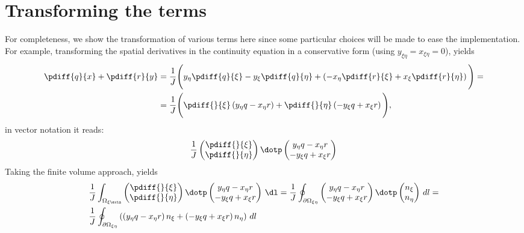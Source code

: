 \section{Transforming the terms}
For completeness, we show the transformation of various terms here since some particular choices will be made to ease the implementation.
For example, transforming the spatial derivatives in the continuity equation in a conservative form (using $y_{\xi\eta} = x_{\xi\eta} = 0$), yields
%
\begin{align}
	\pdiff{q}{x} + \pdiff{r}{y}  & = \frac{1}{J} \Bigg(  y_{\eta} \pdiff{q}{\xi}
    -y_{\xi}\pdiff{q}{\eta} +\left( - x_{\eta}\pdiff{r}{\xi}
    +x_{\xi}\pdiff{r}{\eta} \right) \Bigg) =
     \\
    & =\frac{1}{J}\Bigg( \pdiff{}{\xi} \left( y_{\eta} q - x_{\eta} r \right) + \pdiff{}{\eta} \left( -y_{\xi} q + x_{\xi} r \right)\Bigg),
\end{align}
in vector notation it reads:
\begin{align}
    \frac{1}{J}
    \begin{pmatrix}
    \pdiff{}{\xi} \\ \pdiff{}{\eta}
    \end{pmatrix}
     \dotp
     \begin{pmatrix}
        y_{\eta} q - x_{\eta} r \\ -y_{\xi} q + x_{\xi} r
    \end{pmatrix}
\end{align}
%
Taking the finite volume approach, yields
\begin{align}
&\frac{1}{J}\int_{\Omega_{\xi\exta}}
\begin{pmatrix}
    \pdiff{}{\xi} \\ \pdiff{}{\eta}
\end{pmatrix}
\dotp
\begin{pmatrix}
    y_{\eta} q - x_{\eta} r \\ -y_{\xi} q + x_{\xi} r
\end{pmatrix}
\, \dl
=
\frac{1}{J}\oint_{\partial\Omega_{\xi\eta}}
\begin{pmatrix}
    y_{\eta} q - x_{\eta} r \\ -y_{\xi} q + x_{\xi} r
\end{pmatrix}
\dotp
\begin{pmatrix}
    n_\xi \\ n_\eta
\end{pmatrix}
\, dl =
\\
&
\frac{1}{J}\oint_{\partial\Omega_{\xi\eta}} \left( \left( y_{\eta} q - x_{\eta} r \right)n_\xi + \left( -y_{\xi} q + x_{\xi} r \right) n_\eta \right)\, dl
\end{align}
